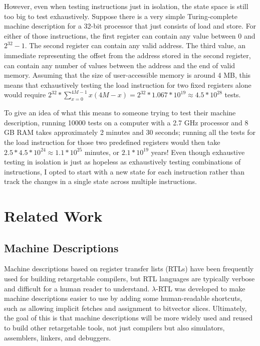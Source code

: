 \documentclass[letterpaper,12pt]{article}
\begin{document}
However, even when testing instructions just in isolation, the state space is still too big to test exhaustively. Suppose there is a very simple Turing-complete machine description for a 32-bit processor that just consists of load and store. For either of those instructions, the first register can contain any value between 0 and $2^{32} - 1$. The second register can contain any valid address. The third value, an immediate representing the offset from the address stored in the second register, can contain any number of values between the address and the end of valid memory\cite{ARM}. Assuming that the size of user-accessible memory is around 4 MB, this means that exhaustively testing the load instruction for two fixed registers alone would require $2^{32} * \sum_{x=0}^{4M-1}x(4M-x) = 2^{32} * 1.067*10^{19} \approx 4.5 * 10^{28}$ tests.

To give an idea of what this means to someone trying to test their machine description, running 10000 tests on a computer with a 2.7 GHz processor and 8 GB RAM takes approximately 2 minutes and 30 seconds; running all the tests for the load instruction for those two predefined registers would then take $2.5 * 4.5 * 10^{24} \approx 1.1 * 10^25$ minutes, or $2.1 * 10^{19}$ years! Even though exhaustive testing in isolation is just as hopeless as exhaustively testing combinations of instructions, I opted to start with a new state for each instruction rather than track the changes in a single state across multiple instructions.

\section{Related Work}

\subsection{Machine Descriptions}

Machine descriptions based on register transfer lists (RTLs) have been frequently used for building retargetable compilers, but RTL languages are typically verbose and difficult for a human reader to understand. $\lambda$-RTL was developed to make machine descriptions easier to use by adding some human-readable shortcuts, such as allowing implicit fetches and assignment to bitvector slices. Ultimately, the goal of this is that machine descriptions will be more widely used and reused to build other retargetable tools, not just compilers but also simulators, assemblers, linkers, and debuggers\cite{Mdesc}.
\end{document}
